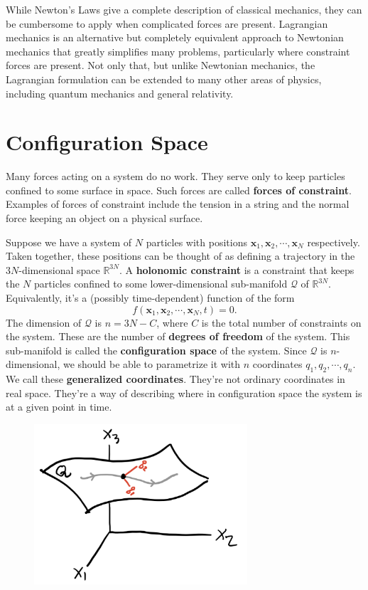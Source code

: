 \documentclass[
  letterpaper,
  DIV=11,
  numbers=noendperiod]{scrreprt}
\begin{document}
While Newton's Laws give a complete description of classical mechanics,
they can be cumbersome to apply when complicated forces are present.
Lagrangian mechanics is an alternative but completely equivalent
approach to Newtonian mechanics that greatly simplifies many problems,
particularly where constraint forces are present. Not only that, but
unlike Newtonian mechanics, the Lagrangian formulation can be extended
to many other areas of physics, including quantum mechanics and general
relativity.

\hypertarget{configuration-space}{%
\section{Configuration Space}\label{configuration-space}}

Many forces acting on a system do no work. They serve only to keep
particles confined to some surface in space. Such forces are called
\textbf{forces of constraint}. Examples of forces of constraint include
the tension in a string and the normal force keeping an object on a
physical surface.

Suppose we have a system of \(N\) particles with positions
\(\mathbf{x}_1, \mathbf{x}_2, \cdots, \mathbf{x}_N\) respectively. Taken
together, these positions can be thought of as defining a trajectory in
the \(3N\)-dimensional space \(\mathbb{R}^{3N}\). A \textbf{holonomic
constraint} is a constraint that keeps the \(N\) particles confined to
some lower-dimensional sub-manifold \(\mathcal{Q}\) of
\(\mathbb{R}^{3N}\). Equivalently, it's a (possibly time-dependent)
function of the form \[
f(\mathbf{x}_1, \mathbf{x}_2, \cdots, \mathbf{x}_N, t) = 0.
\] The dimension of \(\mathcal{Q}\) is \(n=3N-C\), where \(C\) is the
total number of constraints on the system. These are the number of
\textbf{degrees of freedom} of the system. This sub-manifold is called
the \textbf{configuration space} of the system. Since \(\mathcal{Q}\) is
\(n\)-dimensional, we should be able to parametrize it with \(n\)
coordinates \(q_1, q_2, \cdots, q_n\). We call these \textbf{generalized
coordinates}. They're not ordinary coordinates in real space. They're a
way of describing where in configuration space the system is at a given
point in time.

\begin{figure}

{\centering \includegraphics[width=3.125in,height=\textheight]{classical-mechanics/./resources/image-20230218194924026.png}

}

\end{figure}
\end{document}
